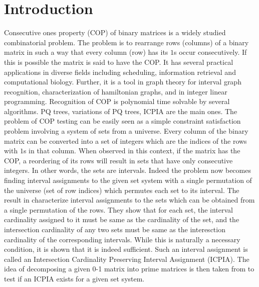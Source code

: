 \documentclass{llncs}
\newcommand{\rcomment}[1]{}
\begin{document}
\section{Introduction}
  \rcomment{Needs a section overhaul }
\noindent
Consecutive ones property (COP) of binary matrices is a widely studied
combinatorial problem. The problem is to rearrange rows (columns) of a
binary matrix in such a way that every column (row) has its $1$s occur
consecutively. If this is possible the matrix is said to have the COP.  It
has several practical applications in diverse fields including
scheduling\cite{hl06}, information retrieval\cite{k77} and
computational biology\cite{abh98}.  Further, it is a tool in graph
theory\cite{mcg04} for interval graph recognition, characterization of
hamiltonian graphs, and in integer linear programming\cite{ht02,hl06}.
Recognition of COP is polynomial time solvable by several
algorithms. PQ trees\cite{bl76}, variations of PQ
trees\cite{mm09,wlh01,wlh02,mcc04}, ICPIA\cite{nsnrs09} are the main
ones.
\noindent
The problem of COP testing can be easily seen as a simple constraint
satisfaction problem involving a system of sets from a universe. Every
column of the binary matrix can be converted into a set of integers
which are the indices of the rows with $1$s in that column. When
observed in this context, if the matrix has the COP, a reordering of its
rows will result in sets that have only consecutive integers. In other
words, the sets are intervals. Indeed the problem now becomes finding
interval assignments to the given set system \cite{nsnrs09} with a
single permutation of the universe (set of row indices) which permutes each
set to its interval. The result in \cite{nsnrs09} characterize
interval assignments to the sets which can be obtained from a single
permutation of the rows.  They show that for each set, the interval
cardinality assigned to it must be same as the cardinality of the set,
and the intersection cardinality of any two sets must be same as the
interesction cardinality of the corresponding intervals.  While this
is naturally a necessary condition, it is shown that it is indeed
sufficient.  Such an interval assignment is called an Intersection
Cardinality Preserving Interval Assignment (ICPIA).  The idea of
decomposing a given 0-1 matrix into prime matrices is then taken from
\cite{wlh02} to test if an ICPIA exists for a given set system.
\end{document}
